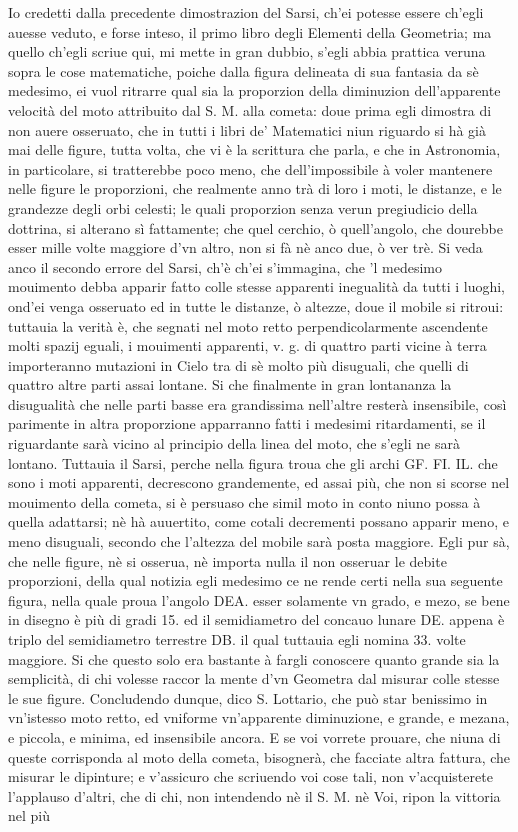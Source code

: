\documentclass[11pt,twoside,openany]{book}
\begin{document}
Io credetti dalla precedente dimostrazion del Sarsi, ch'ei potesse essere ch'egli auesse veduto, e forse inteso, il primo libro degli Elementi della Geometria; ma quello ch'egli scriue qui, mi mette in gran dubbio, s'egli abbia prattica veruna sopra le cose matematiche, poiche dalla figura delineata di sua fantasia da sè medesimo, ei vuol ritrarre qual sia la proporzion della diminuzion dell'apparente velocità del moto attribuito dal S. M. alla cometa: doue prima egli dimostra di non auere osseruato, che in tutti i libri de' Matematici niun riguardo si hà già mai delle figure, tutta volta, che vi è la scrittura che parla, e che in Astronomia, in particolare, si tratterebbe poco meno, che dell'impossibile à voler mantenere nelle figure le proporzioni, che realmente anno trà di loro i moti, le distanze, e le grandezze degli orbi celesti; le quali proporzion senza verun pregiudicio della dottrina, si alterano sì fattamente; che quel cerchio, ò quell'angolo, che dourebbe esser mille volte maggiore d'vn altro, non si fà nè anco due, ò ver trè. Si veda anco il secondo errore del Sarsi, ch'è ch'ei s'immagina, che 'l medesimo mouimento debba apparir fatto colle stesse apparenti inegualità da tutti i luoghi, ond'ei venga osseruato ed in tutte le distanze, ò altezze, doue il mobile si ritroui: tuttauia la verità è, che segnati nel moto retto perpendicolarmente ascendente molti spazij eguali, i mouimenti apparenti, v. g. di quattro parti vicine à terra importeranno mutazioni in Cielo tra di sè molto più disuguali, che quelli di quattro altre parti assai lontane. Si che finalmente in gran lontananza la disugualità che nelle parti basse era grandissima nell'altre resterà insensibile, così parimente in altra proporzione apparranno fatti i medesimi ritardamenti, se il riguardante sarà vicino al principio della linea del moto, che s'egli ne sarà lontano. Tuttauia il Sarsi, perche nella figura troua che gli archi GF. FI. IL. che sono i moti apparenti, decrescono grandemente, ed assai più, che non si scorse nel mouimento della cometa, si è persuaso che simil moto in conto niuno possa à quella adattarsi; nè hà auuertito, come cotali decrementi possano apparir meno, e meno disuguali, secondo che l'altezza del mobile sarà posta maggiore. Egli pur sà, che nelle figure, nè si osserua, nè importa nulla il non osseruar le debite proporzioni, della qual notizia egli medesimo ce ne rende certi nella sua seguente figura, nella quale proua l'angolo DEA. esser solamente vn grado, e mezo, se bene in disegno è più di gradi 15. ed il semidiametro del concauo lunare DE. appena è triplo del semidiametro terrestre DB. il qual tuttauia egli nomina 33. volte maggiore. Si che questo solo era bastante à fargli conoscere quanto grande sia la semplicità, di chi volesse raccor la mente d'vn Geometra dal misurar colle stesse le sue figure. Concludendo dunque, dico S. Lottario, che può star benissimo in vn'istesso moto retto, ed vniforme vn'apparente diminuzione, e grande, e mezana, e piccola, e minima, ed insensibile ancora. E se voi vorrete prouare, che niuna di queste corrisponda al moto della cometa, bisognerà, che facciate altra fattura, che misurar le dipinture; e v'assicuro che scriuendo voi cose tali, non v'acquisterete l'applauso d'altri, che di chi, non intendendo nè il S. M. nè Voi, ripon la vittoria nel più 
\end{document}
